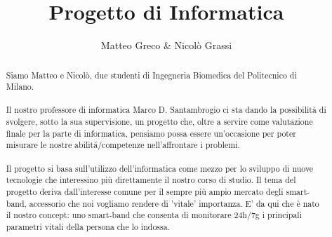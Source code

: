 \documentclass[a4paper, 12pt]{article}
\author{Matteo Greco \& Nicol\`o Grassi}
\title{Progetto di Informatica}
\date{}
\begin{document}
\maketitle
\begin{abstract}
Siamo Matteo e Nicol\`o, due studenti di Ingegneria Biomedica del Politecnico di Milano.\\\\Il nostro professore di informatica Marco D. Santambrogio ci sta dando la possibilit\`a di svolgere, sotto la sua supervisione, un progetto che, oltre a servire come valutazione finale per la parte di informatica, pensiamo possa essere un'occasione per poter misurare le nostre abilit\'a/competenze nell'affrontare i problemi.\\\\
Il progetto si basa sull'utilizzo dell'informatica come mezzo per lo sviluppo di nuove tecnologie che interessino pi\`u direttamente il nostro corso di studio.
Il tema del progetto deriva dall'interesse comune per il sempre pi\`u ampio mercato degli smart-band, accessorio che noi vogliamo rendere di 'vitale' importanza. E' da qui che \`e nato il nostro concept: uno smart-band che consenta di monitorare 24h/7g i principali parametri vitali della persona che lo indossa.
\end{abstract}
\end{document}
